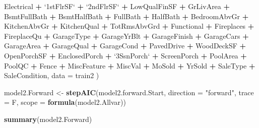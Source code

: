 \documentclass[american,]{article}
\newenvironment{Shaded}{\begin{snugshade}}{\end{snugshade}}
\newcommand{\DataTypeTok}[1]{\textcolor[rgb]{0.13,0.29,0.53}{#1}}
\newcommand{\KeywordTok}[1]{\textcolor[rgb]{0.13,0.29,0.53}{\textbf{#1}}}
\newcommand{\NormalTok}[1]{#1}
\newcommand{\OperatorTok}[1]{\textcolor[rgb]{0.81,0.36,0.00}{\textbf{#1}}}
\newcommand{\StringTok}[1]{\textcolor[rgb]{0.31,0.60,0.02}{#1}}
\theoremstyle{definition}
\theoremstyle{definition}
\theoremstyle{definition}
\theoremstyle{remark}
\begin{document}
\begin{Shaded}
\begin{Highlighting}[]
\StringTok{                      }\NormalTok{Electrical }\OperatorTok{+}\StringTok{ `}\DataTypeTok{1stFlrSF}\StringTok{`} \OperatorTok{+}\StringTok{ `}\DataTypeTok{2ndFlrSF}\StringTok{`} \OperatorTok{+}\StringTok{ }\NormalTok{LowQualFinSF }\OperatorTok{+}\StringTok{ }\NormalTok{GrLivArea }\OperatorTok{+}\StringTok{ }\NormalTok{BsmtFullBath}
                    \OperatorTok{+}\StringTok{ }\NormalTok{BsmtHalfBath }\OperatorTok{+}\StringTok{ }\NormalTok{FullBath }\OperatorTok{+}\StringTok{ }\NormalTok{HalfBath }\OperatorTok{+}\StringTok{ }\NormalTok{BedroomAbvGr }\OperatorTok{+}\StringTok{ }\NormalTok{KitchenAbvGr }\OperatorTok{+}\StringTok{ }\NormalTok{KitchenQual}
                    \OperatorTok{+}\StringTok{ }\NormalTok{TotRmsAbvGrd }\OperatorTok{+}\StringTok{ }\NormalTok{Functional }\OperatorTok{+}\StringTok{ }\NormalTok{Fireplaces }\OperatorTok{+}\StringTok{ }\NormalTok{FireplaceQu }\OperatorTok{+}\StringTok{ }\NormalTok{GarageType }\OperatorTok{+}
\StringTok{                      }\NormalTok{GarageYrBlt }\OperatorTok{+}\StringTok{ }\NormalTok{GarageFinish }\OperatorTok{+}\StringTok{ }\NormalTok{GarageCars }\OperatorTok{+}\StringTok{ }\NormalTok{GarageArea }\OperatorTok{+}\StringTok{ }\NormalTok{GarageQual }\OperatorTok{+}\StringTok{ }\NormalTok{GarageCond}
                    \OperatorTok{+}\StringTok{ }\NormalTok{PavedDrive }\OperatorTok{+}\StringTok{ }\NormalTok{WoodDeckSF }\OperatorTok{+}\StringTok{ }\NormalTok{OpenPorchSF }\OperatorTok{+}\StringTok{ }\NormalTok{EnclosedPorch }\OperatorTok{+}\StringTok{ `}\DataTypeTok{3SsnPorch}\StringTok{`} \OperatorTok{+}
\StringTok{                      }\NormalTok{ScreenPorch }\OperatorTok{+}\StringTok{ }\NormalTok{PoolArea }\OperatorTok{+}\StringTok{ }\NormalTok{PoolQC }\OperatorTok{+}\StringTok{ }\NormalTok{Fence }\OperatorTok{+}\StringTok{ }\NormalTok{MiscFeature }\OperatorTok{+}\StringTok{ }\NormalTok{MiscVal }\OperatorTok{+}\StringTok{ }\NormalTok{MoSold }\OperatorTok{+}
\StringTok{                      }\NormalTok{YrSold }\OperatorTok{+}\StringTok{ }\NormalTok{SaleType }\OperatorTok{+}\StringTok{ }\NormalTok{SaleCondition, }\DataTypeTok{data =}\NormalTok{ train2}
\NormalTok{                    )}

\NormalTok{model2.Forward <-}\StringTok{ }\KeywordTok{stepAIC}\NormalTok{(model2.forward.Start, }\DataTypeTok{direction =} \StringTok{"forward"}\NormalTok{, }\DataTypeTok{trace =}\NormalTok{ F, }\DataTypeTok{scope =} \KeywordTok{formula}\NormalTok{(model2.Allvar))}

\KeywordTok{summary}\NormalTok{(model2.Forward)}
\end{Highlighting}
\end{Shaded}
\end{document}
